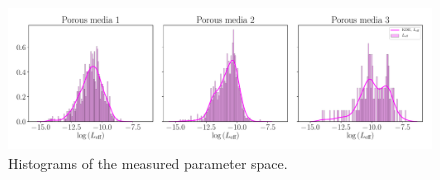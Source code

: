 \documentclass[draft,jgrga]{agutexSI2019}
\begin{document}
\begin{figure}
\noindent\includegraphics[width=15cm]{figures/Leff_integrated_histogram.pdf}
\caption{Histograms of the measured parameter space. }\label{Fig:Hist}
\end{figure}



\end{document}

